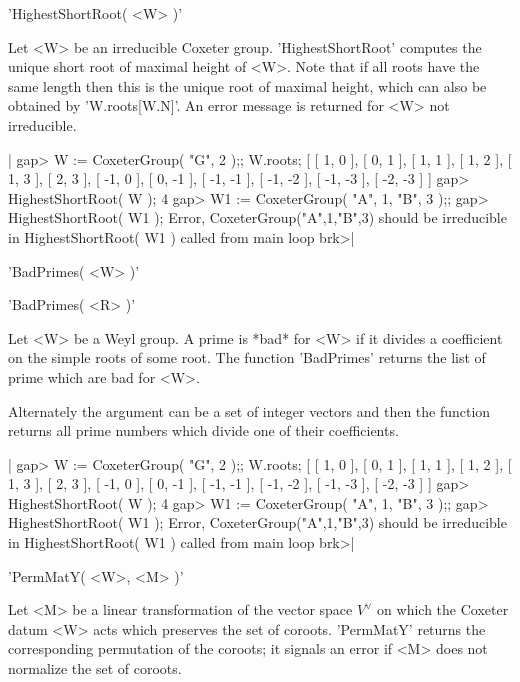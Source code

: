 
'HighestShortRoot( <W> )'

Let <W> be an irreducible Coxeter  group. 'HighestShortRoot' computes the
unique short root of maximal height of <W>.  Note that  if all roots have
the same length then this is the unique root of maximal height, which can
also be obtained by 'W.roots[W.N]'.  An error message is returned for <W>
not irreducible.

|    gap> W := CoxeterGroup( "G", 2 );;  W.roots;
    [ [ 1, 0 ], [ 0, 1 ], [ 1, 1 ], [ 1, 2 ], [ 1, 3 ], [ 2, 3 ],
      [ -1, 0 ], [ 0, -1 ], [ -1, -1 ], [ -1, -2 ], [ -1, -3 ],
      [ -2, -3 ] ]
    gap> HighestShortRoot( W );
    4
    gap> W1 := CoxeterGroup( "A", 1, "B", 3 );;
    gap> HighestShortRoot( W1 );
    Error, CoxeterGroup("A",1,"B",3) should be irreducible
     in
    HighestShortRoot( W1 ) called from
    main loop
    brk>|


'BadPrimes( <W> )'

'BadPrimes( <R> )'

Let  <W>  be  a  Weyl  group.  A  prime  is  *bad*  for <W> if it divides a
coefficient  on the  simple roots  of some  root. The  function 'BadPrimes'
returns the list of prime which are bad for <W>.

Alternately  the argument  can be  a set  of integer  vectors and  then the
function returns all prime numbers which divide one of their coefficients.

|    gap> W := CoxeterGroup( "G", 2 );;  W.roots;
    [ [ 1, 0 ], [ 0, 1 ], [ 1, 1 ], [ 1, 2 ], [ 1, 3 ], [ 2, 3 ],
      [ -1, 0 ], [ 0, -1 ], [ -1, -1 ], [ -1, -2 ], [ -1, -3 ],
      [ -2, -3 ] ]
    gap> HighestShortRoot( W );
    4
    gap> W1 := CoxeterGroup( "A", 1, "B", 3 );;
    gap> HighestShortRoot( W1 );
    Error, CoxeterGroup("A",1,"B",3) should be irreducible
     in
    HighestShortRoot( W1 ) called from
    main loop
    brk>|


'PermMatY( <W>, <M> )'

Let <M> be a linear transformation of  the vector space $V^\vee$ on which
the Coxeter    datum  <W> acts  which  preserves    the  set of  coroots.
'PermMatY'  returns  the  corresponding permutation of    the coroots; it
signals an error if <M> does not normalize the set of coroots.

